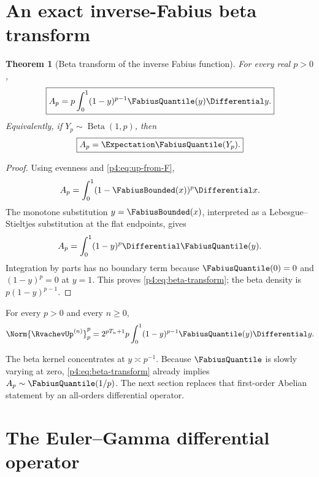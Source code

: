 \documentclass[11pt,oneside]{article}
\newtheorem{theorem}{Theorem}[section]
\theoremstyle{definition}
\theoremstyle{remark}
\begin{document}
\section{An exact inverse-Fabius beta transform}
\label{p4:sec:beta-transform}

\begin{theorem}[Beta transform of the inverse Fabius function]
\label{p4:thm:beta-transform}
For every real $p>0$,
\begin{equation}
 \boxed{
 A_p=p\int_0^1(1-y)^{p-1}\FabiusQuantile(y)\Differential y.}
 \label{p4:eq:beta-transform}
\end{equation}
Equivalently, if $Y_p\sim\operatorname{Beta}(1,p)$, then
\begin{equation}
 \boxed{A_p=\Expectation \FabiusQuantile(Y_p).}
 \label{p4:eq:beta-expectation}
\end{equation}
\end{theorem}

\begin{proof}
Using evenness and \eqref{p4:eq:up-from-F},
\[
 A_p=\int_0^1(1-\FabiusBounded(x))^p\Differential x.
\]
The monotone substitution $y=\FabiusBounded(x)$, interpreted as a
Lebesgue--Stieltjes substitution at the
flat endpoints, gives
\[
 A_p=\int_0^1(1-y)^p\Differential \FabiusQuantile(y).
\]
Integration by parts has no boundary term because $\FabiusQuantile(0)=0$ and
$(1-y)^p=0$ at $y=1$.
This proves \eqref{p4:eq:beta-transform}; the beta density is
$p(1-y)^{p-1}$.
\end{proof}

\begin{corollary}
For every $p>0$ and every $n\geq0$,
\begin{equation}
 \Norm{\RvachevUp^{(n)}}_p^p
 =2^{pT_n+1}p\int_0^1(1-y)^{p-1}\FabiusQuantile(y)\Differential y.
 \label{p4:eq:derivative-beta-transform}
\end{equation}
\end{corollary}

The beta kernel concentrates at $y\asymp p^{-1}$.  Because
$\FabiusQuantile$ is slowly varying at zero,
\eqref{p4:eq:beta-transform} already implies
$A_p\sim\FabiusQuantile(1/p)$.  The next section replaces that
first-order Abelian statement by an all-orders differential operator.

\section{The Euler--Gamma differential operator}
\label{p4:sec:gamma-operator}
\end{document}
